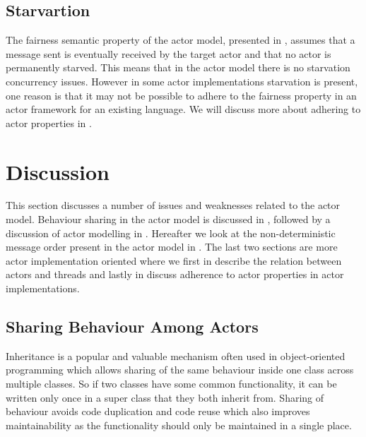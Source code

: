 \subsection{Starvartion}
The fairness semantic property of the actor model, presented in , assumes that a message sent is eventually received by the target actor and that no actor is permanently starved. This means that in the actor model there is no starvation concurrency issues. However in some actor implementations starvation is present, one reason is that it may not be possible to adhere to the fairness property in an actor framework for an existing language. We will discuss more about adhering to actor properties in .
\section{Discussion}\label{sec:actor_discussion}
This section discusses a number of issues and weaknesses related to the actor model. Behaviour sharing in the actor model is discussed in , followed by a discussion of actor modelling in . Hereafter we look at the non-deterministic message order present in the actor model in . The last two sections are more actor implementation oriented where we first in  describe the relation between actors and threads and lastly in  discuss adherence to actor properties in actor implementations.

\subsection{Sharing Behaviour Among Actors}\label{ssec:share_behaviour}
Inheritance is a popular and valuable mechanism often used in object-oriented programming which allows sharing of the same behaviour inside one class across multiple classes\cite{kafura1989inheritance}. So if two classes have some common functionality, it can be written only once in a super class that they both inherit from. Sharing of behaviour avoids code duplication and code reuse which also improves maintainability as the functionality should only be maintained in a single place.

